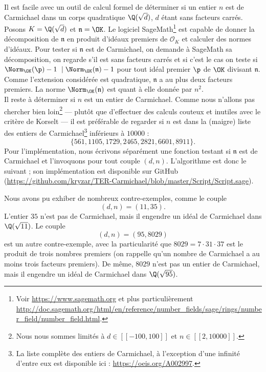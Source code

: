 \documentclass[a4paper, 12pt, oneside]{article}
\begin{document}
Il est facile avec un outil de calcul formel de déterminer si un entier $n$ est de Carmichael dans un corps quadratique $\Q(\sqrt{d})$, $d$ étant sans facteurs carrés. Posons $K=\Q(\sqrt{d})$ et $\mathfrak{n} = \OK$. Le logiciel SageMath\footnote{Voir \url{https://www.sagemath.org} et plus particulièrement \url{http://doc.sagemath.org/html/en/reference/number_fields/sage/rings/number_field/number_field.html}.} est capable de donner la décomposition de $\mathfrak{n}$ en produit d'idéaux premiers de $\mathcal{O}_K$ et calculer des normes d'idéaux. Pour tester si $\mathfrak{n}$ est de Carmichael, on demande à SageMath sa décomposition, on regarde s'il est sans facteurs carrés et si c'est le cas on teste si $\Norm_\OK(\p) - 1 \mid \Norm_\OK(\mathfrak{n}) - 1$ pour tout idéal premier $\p$ de $\OK$ divisant $\mathfrak{n}$. Comme l'extension considérée est quadratique, $\mathfrak{n}$ a au plus deux facteurs premiers. La norme $\Norm_\OK(\mathfrak{n})$ est quant à elle donnée par $n^2$. \\

Il reste à déterminer si $n$ est un entier de Carmichael. Comme nous n'allons pas chercher bien loin\footnote{Nous nous sommes limités à $d\in [\![-100, 100]\!]$ et $n\in [\![2, 10000]\!]$.} — plutôt que d'effectuer des calculs couteux et inutiles avec le critère de Korselt — il est préférable de regarder si $n$ est dans la (maigre) liste des entiers de Carmichael\footnote{La liste complète des entiers de Carmichael, à l'exception d'une infinité d'entre eux est disponible ici : \url{https://oeis.org/A002997}.} inférieurs à $10000$ : $$\{561, 1105, 1729, 2465, 2821, 6601, 8911\}.$$ Pour l'implémentation, nous écrivons séparément une fonction testant si $\mathfrak{n}$ est de Carmichael et l'invoquons pour tout couple $(d, n)$. L'algorithme est donc le suivant ; son implémentation est disponible sur GitHub (\url{https://github.com/kryzar/TER-Carmichael/blob/master/Script/Script.sage}).

\vspace{1em}
\begin{algorithm}[H]
\end{algorithm}
\vspace{1em}

Nous avons pu exhiber de nombreux contre-exemples, comme le couple $$(d, n) = (11, 35).$$ L'entier $35$ n'est pas de Carmichael, mais il engendre un idéal de Carmichael dans $\Q(\sqrt{11})$. Le couple $$(d, n) = (95,8029)$$ est un autre contre-exemple, avec la particularité que $8029 = 7\cdot 31\cdot 37$ est le produit de trois nombres premiers (on rappelle qu'un nombre de Carmichael a au moins trois facteurs premiers). De même, $8029$ n'est pas un entier de Carmichael, mais il engendre un idéal de Carmichael dans $\Q(\sqrt{95})$.
\end{document}
